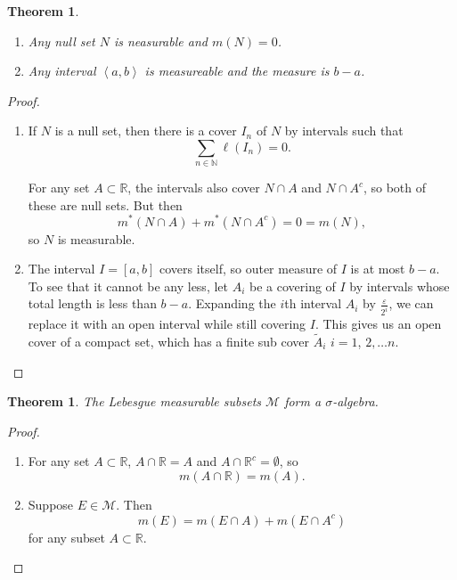 \documentclass[a4paper,12pt]{scrreprt}
\newcommand{\R}{\mathbb{R}}
\newcommand{\N}{\mathbb{N}}
\theoremstyle{definition}
\theoremstyle{plain}
\newtheorem{theorem}[definition]{Theorem}
\theoremstyle{remark}
\begin{document}
\begin{theorem}
  \label{thm:nullsetsandintervalsarelebesguemeasurable}
  $\,$
  \begin{enumerate}
    \item Any null set $N$ is neasurable and $m(N) = 0$.

    \item Any interval $\left\langle a, b \right\rangle$ is measureable and the measure is $b-a$.
  \end{enumerate}
\end{theorem}
\begin{proof}
  $\,$
  \begin{enumerate}
    \item If $N$ is a null set, then there is a cover $I_{n}$ of $N$ by intervals such that
      \begin{equation*}
        \sum_{n \in \N} \ell(I_{n}) = 0.
      \end{equation*}

      For any set $A \subset \R$, the intervals also cover $N \cap A$ and $N \cap A^{c}$, so both of these are null sets. But then
      \begin{equation*}
        m^{*}(N \cap A) + m^{*}(N \cap A^{c}) = 0 = m(N),
      \end{equation*}
      so $N$ is measurable.

    \item The interval $I = [a, b]$ covers itself, so outer measure of $I$ is at most $b - a$. To see that it cannot be any less, let $A_{i}$ be a covering of $I$ by intervals whose total length is less than $b-a$. Expanding the $i$th interval $A_{i}$ by $\frac{\varepsilon}{2^{i}}$, we can replace it with an open interval while still covering $I$. This gives us an open cover of a compact set, which has a finite sub cover $\tilde{A}_{i}$ $i = 1$, $2, \ldots n$.
  \end{enumerate}
\end{proof}

\begin{theorem}
  The Lebesgue measurable subsets $\mathcal{M}$ form a $\sigma$-algebra.
\end{theorem}
\begin{proof}
  $\,$
  \begin{enumerate}
    \item For any set $A \subset \R$, $A \cap \R = A$ and $A \cap \R^{c} = \emptyset$, so
      \begin{equation*}
        m(A \cap \R) = m(A).
      \end{equation*}

    \item Suppose $E \in \mathcal{M}$. Then
      \begin{equation*}
        m(E) = m(E \cap A) + m(E \cap A^{c})
      \end{equation*}
      for any subset $A \subset \R$.
  \end{enumerate}
\end{proof}
\end{document}
